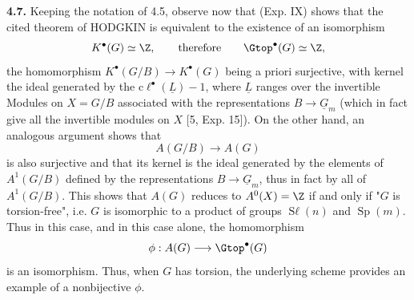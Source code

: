 \textbf{4.7.} Keeping the notation of 4.5, observe now that (Exp. IX) shows that the cited theorem of HODGKIN is equivalent to the existence of an isomorphism
\[
 K^\bullet(G)\simeq\Z,\qquad\text{therefore}\qquad \Gtop^\bullet(G)\simeq\Z,
\]
the homomorphism $K^\bullet(G/B)\to K^\bullet(G)$ being a priori surjective, with kernel the ideal generated by the $\mathrm{c}\ell^\bullet(\underline{L})-1$, where $\underline{L}$ ranges over the invertible Modules on $X=G/B$ associated with the representations $B\to\underline{G}_m$ (which in fact give all the invertible modules on $X$ [5, Exp. 15]). On the other hand, an analogous argument shows that
\[
 A(G/B)\longrightarrow A(G)
\]
is also surjective and that its kernel is the ideal generated by the elements of $A^1(G/B)$ defined by the representations $B\to\underline{G}_m$, thus in fact by all of $A^1(G/B)$. This shows that $A(G)$ reduces to $A^0(X)=\Z$ if and
%
only if "$G$ is torsion-free", i.e. $G$ is isomorphic to a product of groups $\operatorname{S\ell}(n)$ and $\operatorname{Sp}(m)$. Thus in this case, and in this case alone, the homomorphism
\[
 \phi:A(G)\longrightarrow\Gtop^\bullet(G)
\]
is an isomorphism. Thus, when $G$ has torsion, the underlying scheme provides an example of a nonbijective $\phi$.

